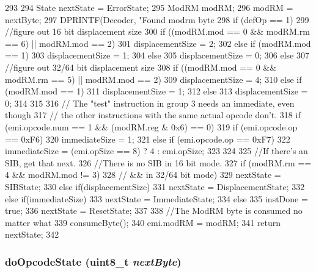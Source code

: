 \begin{DoxyCode}
293 {
294     State nextState = ErrorState;
295     ModRM modRM;
296     modRM = nextByte;
297     DPRINTF(Decoder, "Found modrm byte %
298     if (defOp == 1) {
299         //figure out 16 bit displacement size
300         if ((modRM.mod == 0 && modRM.rm == 6) || modRM.mod == 2)
301             displacementSize = 2;
302         else if (modRM.mod == 1)
303             displacementSize = 1;
304         else
305             displacementSize = 0;
306     } else {
307         //figure out 32/64 bit displacement size
308         if ((modRM.mod == 0 && modRM.rm == 5) || modRM.mod == 2)
309             displacementSize = 4;
310         else if (modRM.mod == 1)
311             displacementSize = 1;
312         else
313             displacementSize = 0;
314     }
315 
316     // The "test" instruction in group 3 needs an immediate, even though
317     // the other instructions with the same actual opcode don't.
318     if (emi.opcode.num == 1 && (modRM.reg & 0x6) == 0) {
319        if (emi.opcode.op == 0xF6)
320            immediateSize = 1;
321        else if (emi.opcode.op == 0xF7)
322            immediateSize = (emi.opSize == 8) ? 4 : emi.opSize;
323     }
324 
325     //If there's an SIB, get that next.
326     //There is no SIB in 16 bit mode.
327     if (modRM.rm == 4 && modRM.mod != 3) {
328             // && in 32/64 bit mode)
329         nextState = SIBState;
330     } else if(displacementSize) {
331         nextState = DisplacementState;
332     } else if(immediateSize) {
333         nextState = ImmediateState;
334     } else {
335         instDone = true;
336         nextState = ResetState;
337     }
338     //The ModRM byte is consumed no matter what
339     consumeByte();
340     emi.modRM = modRM;
341     return nextState;
342 }
\end{DoxyCode}
\hypertarget{classX86ISA_1_1Decoder_af4ad421adb9b081935801bf19bf0d563}{
\subsubsection[{doOpcodeState}]{ doOpcodeState (uint8\_\-t {\em nextByte})}}
\label{classX86ISA_1_1Decoder_af4ad421adb9b081935801bf19bf0d563}



